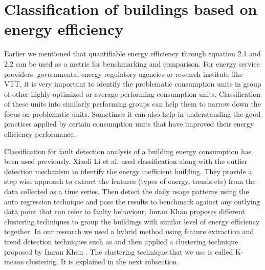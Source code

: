 \section{Classification of buildings based on energy efficiency}\label{classify}

Earlier we mentioned that quantifiable energy efficiency through equation 2.1 and 2.2 can be used as a metric for benchmarking and comparison. For energy service providers, governmental energy regulatory agencies or research institute like VTT, it is very important to identify the problematic consumption units in group of other highly optimized or average performing consumption units. Classification of these units into similarly performing groups can help them to narrow down the focus on problematic units. Sometimes it can also help in understanding the good practices applied by certain consumption units that have improved their energy efficiency performance.
  
Classification for fault detection analysis of a building energy consumption has been used previously. Xiaoli Li et al. \cite{li2010classification} used classification along with the outlier detection mechanism to identify the energy inefficient building. They provide a step wise approach to extract the features (types of energy, trends etc) from the data collected as a time series. Then detect the daily usage patterns using the auto regression technique and pass the results to benchmark against any outlying data point that can refer to faulty behaviour. Imran Khan \cite{khan2013fault} proposes different clustering techniques to group the buildings with similar level of energy efficiency together. In our research we used a hybrid method using feature extraction and trend detection techniques such as \cite{li2010classification} and then applied a clustering technique proposed by Imran Khan \cite{khan2013fault}. The clustering technique that we use is called K-means clustering. It is explained in the next subsection. 

